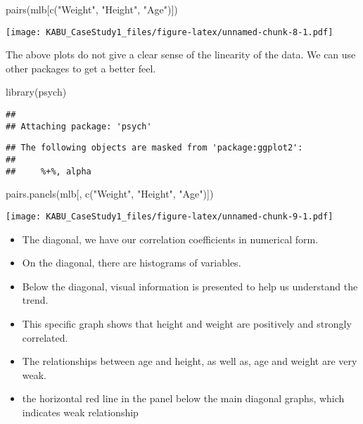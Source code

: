 \documentclass[
]{article}
\newenvironment{Shaded}{\begin{snugshade}}{\end{snugshade}}
\newcommand{\FunctionTok}[1]{\textcolor[rgb]{0.00,0.00,0.00}{#1}}
\newcommand{\NormalTok}[1]{#1}
\newcommand{\StringTok}[1]{\textcolor[rgb]{0.31,0.60,0.02}{#1}}
\providecommand{\tightlist}{%
  \setlength{\itemsep}{0pt}\setlength{\parskip}{0pt}}
\begin{document}
\begin{Shaded}
\begin{Highlighting}[]
\FunctionTok{pairs}\NormalTok{(mlb[}\FunctionTok{c}\NormalTok{(}\StringTok{"Weight"}\NormalTok{, }\StringTok{"Height"}\NormalTok{, }\StringTok{"Age"}\NormalTok{)])}
\end{Highlighting}
\end{Shaded}

\texttt{[image: KABU\_CaseStudy1\_files/figure-latex/unnamed-chunk-8-1.pdf]}

The above plots do not give a clear sense of the linearity of the data.
We can use other packages to get a better feel.

\begin{Shaded}
\begin{Highlighting}[]
\FunctionTok{library}\NormalTok{(psych)}
\end{Highlighting}
\end{Shaded}

\begin{verbatim}
## 
## Attaching package: 'psych'
\end{verbatim}

\begin{verbatim}
## The following objects are masked from 'package:ggplot2':
## 
##     %+%, alpha
\end{verbatim}

\begin{Shaded}
\begin{Highlighting}[]
\FunctionTok{pairs.panels}\NormalTok{(mlb[, }\FunctionTok{c}\NormalTok{(}\StringTok{"Weight"}\NormalTok{, }\StringTok{"Height"}\NormalTok{, }\StringTok{"Age"}\NormalTok{)])}
\end{Highlighting}
\end{Shaded}

\texttt{[image: KABU\_CaseStudy1\_files/figure-latex/unnamed-chunk-9-1.pdf]}

\begin{itemize}
\tightlist
\item
  The diagonal, we have our correlation coefficients in numerical form.
\item
  On the diagonal, there are histograms of variables.
\item
  Below the diagonal, visual information is presented to help us
  understand the trend.
\item
  This specific graph shows that height and weight are positively and
  strongly correlated.
\item
  The relationships between age and height, as well as, age and weight
  are very weak.
\item
  the horizontal red line in the panel below the main diagonal graphs,
  which indicates weak relationship
\end{itemize}
\end{document}
